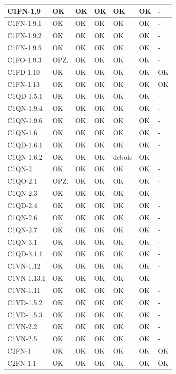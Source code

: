 \begin{footnotesize}
\begin{longtable}{|p{}|p{}|p{}|p{}|p{}|p{}|p{}|}
 C1FN-1.9&  OK&  OK&  OK&  OK&  OK& -\\ \hline
 C1FN-1.9.1&  OK&  OK&  OK&  OK&  OK& -\\ \hline
 C1FN-1.9.2&  OK&  OK&  OK&  OK&  OK& -\\ \hline
 C1FN-1.9.5&  OK&  OK&  OK&  OK&  OK& -\\ \hline
 C1FO-1.9.3&  OPZ.&  OK&  OK&  OK&  OK& -\\ \hline
 C1FD-1.10&  OK&  OK&  OK&  OK&  OK& OK\\ \hline
 C1FN-1.13&  OK&  OK&  OK&  OK&  OK& OK\\ \hline
 C1QD-1.5.1&  OK&  OK&  OK&  OK&  OK& -\\ \hline
 C1QN-1.9.4&  OK&  OK&  OK&  OK&  OK& -\\ \hline
 C1QN-1.9.6&  OK&  OK&  OK&  OK&  OK& -\\ \hline
 C1QN-1.6&  OK&  OK&  OK&  OK&  OK& -\\ \hline
 C1QD-1.6.1&  OK&  OK&  OK&  OK&  OK& -\\ \hline
 C1QN-1.6.2&  OK&  OK&  OK&  debole&  OK& -\\ \hline
 C1QN-2&  OK&  OK&  OK&  OK&  OK& -\\ \hline
 C1QO-2.1&  OPZ.&  OK&  OK&  OK&  OK& -\\ \hline
 C1QN-2.3&  OK&  OK&  OK&  OK&  OK& -\\ \hline
 C1QD-2.4&  OK&  OK&  OK&  OK&  OK& -\\ \hline
 C1QN-2.6&  OK&  OK&  OK&  OK&  OK& -\\ \hline
 C1QN-2.7&  OK&  OK&  OK&  OK&  OK& -\\ \hline
 C1QN-3.1&  OK&  OK&  OK&  OK&  OK& -\\ \hline
 C1QD-3.1.1&  OK&  OK&  OK&  OK&  OK& -\\ \hline
 C1VN-1.12&  OK&  OK&  OK&  OK&  OK& -\\ \hline
 C1VN-1.13.1&  OK&  OK&  OK&  OK&  OK& -\\ \hline
 C1VN-1.11&  OK&  OK&  OK&  OK&  OK& -\\ \hline
 C1VD-1.5.2&  OK&  OK&  OK&  OK&  OK& -\\ \hline
 C1VD-1.5.3&  OK&  OK&  OK&  OK&  OK& -\\ \hline
 C1VN-2.2&  OK&  OK&  OK&  OK&  OK& -\\ \hline
 C1VN-2.5&  OK&  OK&  OK&  OK&  OK& -\\ \hline
 C2FN-1&  OK&  OK&  OK&  OK&  OK& OK\\ \hline
 C2FN-1.1&  OK&  OK&  OK&  OK&  OK& OK\\ \hline

\end{longtable}
\end{footnotesize}
